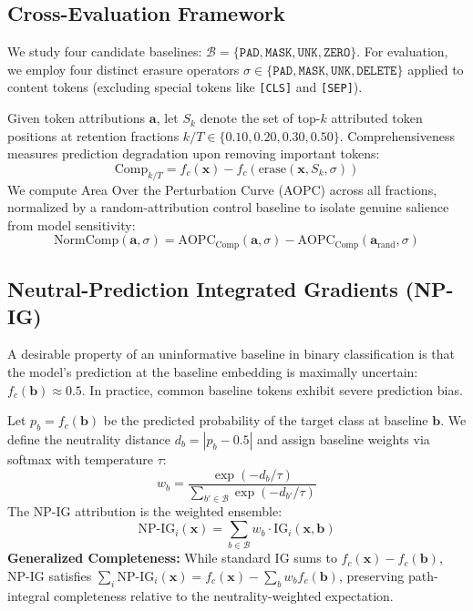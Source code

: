 \documentclass[11pt]{article}
\begin{document}
\subsection{Cross-Evaluation Framework}
We study four candidate baselines:
$\mathcal{B} = \{\texttt{PAD}, \texttt{MASK}, \texttt{UNK}, \texttt{ZERO}\}$.
For evaluation, we employ four distinct erasure operators $\sigma \in \{\texttt{PAD}, \texttt{MASK}, \texttt{UNK}, \texttt{DELETE}\}$ applied to content tokens (excluding special tokens like \texttt{[CLS]} and \texttt{[SEP]}).

Given token attributions $\mathbf{a}$, let $S_k$ denote the set of top-$k$ attributed token positions at retention fractions $k/T \in \{0.10, 0.20, 0.30, 0.50\}$. Comprehensiveness measures prediction degradation upon removing important tokens:
\begin{equation}
\text{Comp}_{k/T} = f_c(\mathbf{x}) - f_c(\text{erase}(\mathbf{x}, S_k, \sigma))
\end{equation}
We compute Area Over the Perturbation Curve (AOPC) across all fractions, normalized by a random-attribution control baseline to isolate genuine salience from model sensitivity:
\begin{equation}
\text{NormComp}(\mathbf{a}, \sigma) = \text{AOPC}_{\text{Comp}}(\mathbf{a}, \sigma) - \text{AOPC}_{\text{Comp}}(\mathbf{a}_{\text{rand}}, \sigma)
\end{equation}

\subsection{Neutral-Prediction Integrated Gradients (NP-IG)}
A desirable property of an uninformative baseline in binary classification is that the model's prediction at the baseline embedding is maximally uncertain: $f_c(\mathbf{b}) \approx 0.5$. In practice, common baseline tokens exhibit severe prediction bias.

Let $p_b = f_c(\mathbf{b})$ be the predicted probability of the target class at baseline $\mathbf{b}$. We define the neutrality distance $d_b = |p_b - 0.5|$ and assign baseline weights via softmax with temperature $\tau$:
\begin{equation}
w_b = \frac{\exp(-d_b / \tau)}{\sum_{b' \in \mathcal{B}} \exp(-d_{b'} / \tau)}
\end{equation}
The NP-IG attribution is the weighted ensemble:
\begin{equation}
\text{NP-IG}_i(\mathbf{x}) = \sum_{b \in \mathcal{B}} w_b \cdot \text{IG}_i(\mathbf{x}, \mathbf{b})
\end{equation}
\textbf{Generalized Completeness:} While standard IG sums to $f_c(\mathbf{x}) - f_c(\mathbf{b})$, NP-IG satisfies $\sum_i \text{NP-IG}_i(\mathbf{x}) = f_c(\mathbf{x}) - \sum_b w_b f_c(\mathbf{b})$, preserving path-integral completeness relative to the neutrality-weighted expectation.
\end{document}
